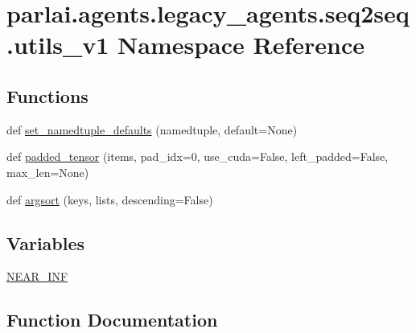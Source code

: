 \hypertarget{namespaceparlai_1_1agents_1_1legacy__agents_1_1seq2seq_1_1utils__v1}{}\section{parlai.\+agents.\+legacy\+\_\+agents.\+seq2seq.\+utils\+\_\+v1 Namespace Reference}
\label{namespaceparlai_1_1agents_1_1legacy__agents_1_1seq2seq_1_1utils__v1}
\subsection*{Functions}
\begin{DoxyCompactItemize}
\item 
def \hyperlink{namespaceparlai_1_1agents_1_1legacy__agents_1_1seq2seq_1_1utils__v1_a17553492abb2e671bc3fc58e1e3a96b0}{set\+\_\+namedtuple\+\_\+defaults} (namedtuple, default=None)
\item 
def \hyperlink{namespaceparlai_1_1agents_1_1legacy__agents_1_1seq2seq_1_1utils__v1_adb5a414ae439f14c54e8c760b91cc4c8}{padded\+\_\+tensor} (items, pad\+\_\+idx=0, use\+\_\+cuda=False, left\+\_\+padded=False, max\+\_\+len=None)
\item 
def \hyperlink{namespaceparlai_1_1agents_1_1legacy__agents_1_1seq2seq_1_1utils__v1_a1521e559b740f741ebb47b8755202bb2}{argsort} (keys, lists, descending=False)
\end{DoxyCompactItemize}
\subsection*{Variables}
\begin{DoxyCompactItemize}
\item 
\hyperlink{namespaceparlai_1_1agents_1_1legacy__agents_1_1seq2seq_1_1utils__v1_a8633d2afbc49aa79847d77b922dbed81}{N\+E\+A\+R\+\_\+\+I\+NF}
\end{DoxyCompactItemize}


\subsection{Function Documentation}
\mbox{\label{namespaceparlai_1_1agents_1_1legacy__agents_1_1seq2seq_1_1utils__v1_a1521e559b740f741ebb47b8755202bb2}} 
